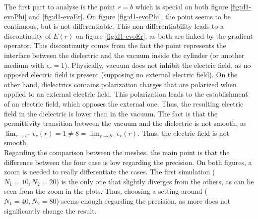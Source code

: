 \documentclass[a4paper,12pt,twoside]{article}
\newcommand{\bracket}[1]{\left(#1\right)}
\begin{document}
  The first part to analyse is the point $r=b$ which is special on both figure \ref{fig:d1-evoPhi} and \ref{fig:d1-evoEr}.
  On figure \ref{fig:d1-evoPhi}, the point seems to be continuous, but is not differentiable.
  This non-differentiability leads to a discontinuity of $E\bracket{r}$ on figure \ref{fig:d1-evoEr}, as both are linked by the gradient operator.
  This discontinuity comes from the fact the point represents the interface between the dielectric and the vacuum inside the cylinder (or another medium with $\epsilon_r=1$).
  Physically, vacuum does not inhibit the electric field, as no opposed electric field is present (supposing no external electric field).
  On the other hand, dielectrics contains polarization charges that are polarized when applied to an external electric field. \cite{wiki:dielectrics}
  This polarization leads to the establishment of an electric field, which opposes the external one.
  Thus, the resulting electric field in the dielectric is lower than in the vacuum.
  The fact is that the permittivity transition between the vacuum and the dielectric is not smooth, as $\lim_{r\rightarrow b^-}\epsilon_r\bracket{r} = 1 \neq 8 = \lim_{r\rightarrow b^+}\epsilon_r\bracket{r}$. Thus, the electric field is not smooth.\\ %

  Regarding the comparison between the meshes, the main point is that the difference between the four case is low regarding the precision.
  On both figures, a zoom is needed to really differentiate the cases.
  The first simulation ($N_1=10, N_2=20$) is the only one that slightly diverges from the others, as can be seen from the zoom in the plots.
  Thus, choosing a setting around ($N_1=40, N_2=80$) seems enough regarding the precision, as more does not significantly change the result.\\
\end{document}

